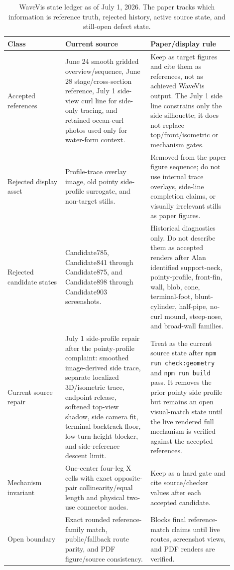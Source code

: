 \documentclass[12pt,letterpaper]{article}
\newcommand{\code}[1]{\texttt{#1}}
\begin{document}
\begin{table}[H]
\centering
{\small
\begin{tabular}{@{}Y{0.23\linewidth}Y{0.34\linewidth}Y{0.33\linewidth}@{}}
\toprule
Class & Current source & Paper/display rule \\
\midrule
Accepted references & June 24 smooth gridded overview/sequence, June 28 stage/cross-section reference, July 1 side-view curl line for side-only tracing, and retained ocean-curl photos used only for water-form context. & Keep as target figures and cite them as references, not as achieved WaveVis output. The July 1 side line constrains only the side silhouette; it does not replace top/front/isometric or mechanism gates. \\
Rejected display asset & Profile-trace overlay image, old pointy side-profile surrogate, and non-target stills. & Removed from the paper figure sequence; do not use internal trace overlays, side-line completion claims, or visually irrelevant stills as paper figures. \\
Rejected candidate states & Candidate785, Candidate841 through Candidate875, and Candidate898 through Candidate903 screenshots. & Historical diagnostics only. Do not describe them as accepted renders after Alan identified support-neck, pointy-profile, front-fin, wall, blob, cone, terminal-foot, blunt-cylinder, half-pipe, no-curl mound, steep-nose, and broad-wall families. \\
Current source repair & July 1 side-profile repair after the pointy-profile complaint: smoothed image-derived side trace, separate localized 3D/isometric trace, endpoint release, softened top-view shadow, side camera fit, terminal-backtrack floor, low-turn-height blocker, and side-reference descent limit. & Treat as the current source state after \code{npm run check:geometry} and \code{npm run build} pass. It removes the prior pointy side profile but remains an open visual-match state until the live rendered full mechanism is verified against the accepted references. \\
Mechanism invariant & One-center four-leg X cells with exact opposite-pair collinearity/equal length and physical two-use connector nodes. & Keep as a hard gate and cite source/checker values after each accepted candidate. \\
Open boundary & Exact rounded reference-family match, public/fallback route parity, and PDF figure/source consistency. & Blocks final reference-match claims until live routes, screenshot views, and PDF renders are verified. \\
\bottomrule
\end{tabular}
}
\caption{WaveVis state ledger as of July 1, 2026. The paper tracks which information is reference truth, rejected history, active source state, and still-open defect state.}
\label{tab:current-ledger}
\end{table}
\end{document}
